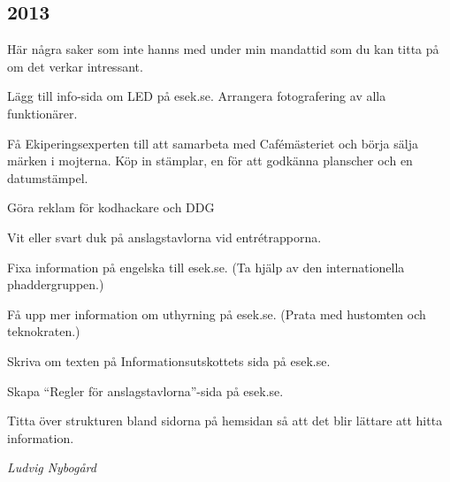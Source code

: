 \documentclass[10pt]{article}
\begin{document}
\subsection{2013}
Här några saker som inte hanns med under min mandattid som du kan titta på om det verkar intressant.
\begin{tightdashlist}
    \item Lägg till info-sida om LED på esek.se. Arrangera fotografering av alla funktionärer.
    \item Få Ekiperingsexperten till att samarbeta med Cafémästeriet och börja sälja märken i mojterna. Köp in stämplar, en för att godkänna planscher och en datumstämpel.
    \item Göra reklam för kodhackare och DDG
    \item Vit eller svart duk på anslagstavlorna vid entrétrapporna.
    \item Fixa information på engelska till esek.se. (Ta hjälp av den internationella phaddergruppen.)
    \item Få upp mer information om uthyrning på esek.se. (Prata med hustomten och teknokraten.)
    \item Skriva om texten på Informationsutskottets sida på esek.se.
    \item Skapa “Regler för anslagstavlorna”-sida på esek.se.
    \item Titta över strukturen bland sidorna på hemsidan så att det blir lättare att hitta information.
\end{tightdashlist}

\emph{Ludvig Nybogård}
\end{document}
